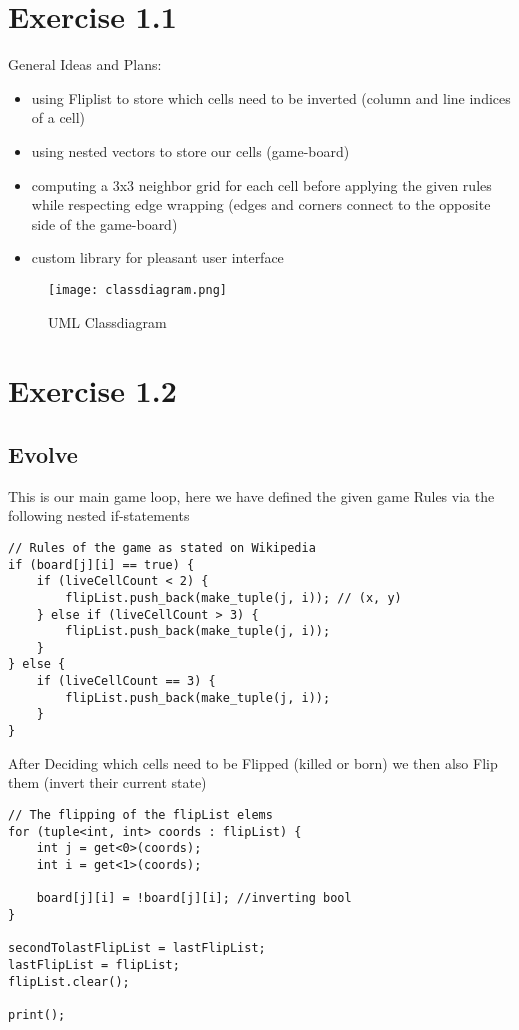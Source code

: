 \documentclass[a4paper]{article}
\begin{document}
\section{Exercise 1.1}
General Ideas and Plans:
\begin{itemize}
    \item using Fliplist to store which cells need to be inverted (column and line indices of a cell)
    \item using nested vectors to store our cells (game-board)
    \item computing a 3x3 neighbor grid for each cell before applying the given rules while respecting edge wrapping (edges and corners connect to the opposite side of the game-board)
    \item custom library for pleasant user interface
\end{itemize}
\begin{figure}[H]
    \centering
    \texttt{[image: classdiagram.png]}
    \caption{UML Classdiagram}
\end{figure}
\clearpage
\section{Exercise 1.2}
\subsection{Evolve}
This is our main game loop, here we have defined the given game Rules via the following nested if-statements 
\begin{lstlisting}[caption={"Game Rules"}]
// Rules of the game as stated on Wikipedia
if (board[j][i] == true) {
    if (liveCellCount < 2) {
        flipList.push_back(make_tuple(j, i)); // (x, y)
    } else if (liveCellCount > 3) {
        flipList.push_back(make_tuple(j, i));
    }
} else {
    if (liveCellCount == 3) {
        flipList.push_back(make_tuple(j, i));
    }
}
\end{lstlisting}
After Deciding which cells need to be Flipped (killed or born) we then also Flip them (invert their current state)
\begin{lstlisting}[caption={"Changing cell States"}]
// The flipping of the flipList elems
for (tuple<int, int> coords : flipList) {
    int j = get<0>(coords);
    int i = get<1>(coords);

    board[j][i] = !board[j][i]; //inverting bool
}

secondTolastFlipList = lastFlipList;
lastFlipList = flipList;
flipList.clear();

print();
\end{lstlisting}
\clearpage
\end{document}
